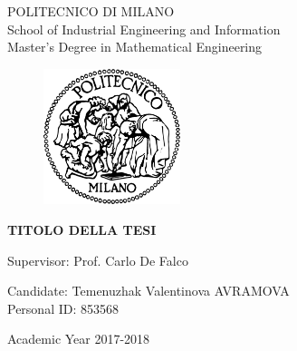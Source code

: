 \thispagestyle{empty}

\vspace*{-1.5cm} 
\begin{bfseries}

\begin{center}
	\Large
	POLITECNICO DI MILANO\\
	\Large
	School of Industrial Engineering and Information\\
	Master's Degree in Mathematical Engineering\\
	\begin{figure}[htbp]
		\begin{center}
			\includegraphics[width=4cm]{logopoli}
		\end{center}
	\end{figure}
	\vspace*{0.3cm} \LARGE		
	\textbf{TITOLO DELLA TESI}\\		
\end{center}
\vspace*{3.0cm}

\end{bfseries}

\vspace*{2cm}	
\begin{flushleft}
	\Large
	Supervisor: Prof. Carlo De Falco \\
\end{flushleft}
\vspace*{1.4cm}
	
\begin{flushright}
	\Large
	Candidate: Temenuzhak Valentinova AVRAMOVA\\
	Personal ID:  853568\\ 
\end{flushright}	
\vspace*{1.7cm}
	
\begin{center}		
	\Large
	Academic Year 2017-2018
\end{center} \clearpage








